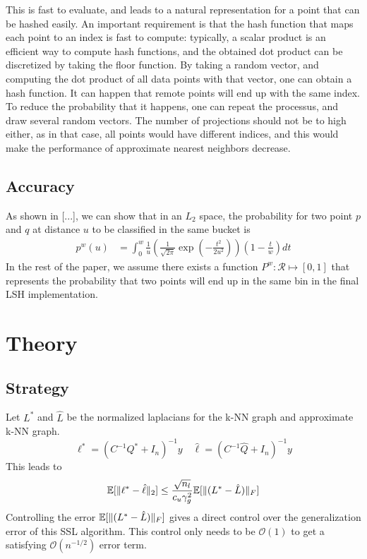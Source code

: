 \documentclass{article} %
\begin{document}
This is fast to evaluate, and leads to a natural representation for a point that can be hashed easily.  An important requirement is that the hash function that maps each point to an index is fast to compute: typically, a scalar product is an efficient way to compute hash functions, and the obtained dot product can be discretized by taking the floor function. By taking a random vector, and computing the dot product of all data points with that vector, one can obtain a hash function. It can happen that remote points will end up with the same index. To reduce the probability that it happens, one can repeat the processus, and draw several random vectors. The number of projections should not be to high either, as in that case, all points would have different indices, and this would make the performance of approximate nearest neighbors decrease.

\subsection{Accuracy}
As shown in [...], we can show that in an $L_2$ space, the probability for two point $p$ and $q$ at distance $u$ to be classified in the same bucket is 
\begin{align*}
  p^w(u) &= \int_0^w \frac{1}{u}\left( \frac{1}{\sqrt{2\pi}}\exp(-\frac{t^2}{2u^2})\right)\left(1-\frac{t}{w}\right)dt
\end{align*}
In the rest of the paper, we assume there exists a function $P^w:\mathcal{R}\mapsto [0,1]$ that represents the probability that two points will end up in the same bin in the final LSH implementation.

\section{Theory}
\subsection{Strategy}
Let $L^*$ and $\hat{L}$ be the normalized laplacians for the k-NN graph and approximate k-NN graph.
$$\ell^* = (C^{-1}Q^* + I_n)^{-1}y \quad \hat{\ell} = (C^{-1}\hat{Q} + I_n)^{-1}y$$
This leads to 
$$ \mathbb{E}[\Arrowvert\ell^*-\hat{\ell}\Arrowvert_2] \leq \frac{\sqrt{n_l}}{c_u\gamma_g^2}\mathbb{E}[\Arrowvert(L^*-\hat{L})\Arrowvert_F]$$
Controlling the error $\mathbb{E}[\Arrowvert(L^*-\hat{L})\Arrowvert_F]$ gives a direct control over the generalization error of this SSL algorithm. This control only needs to be $\mathcal{O}(1)$ to get a satisfying $\mathcal{O}(n^{-1/2})$ error term.
\end{document}
